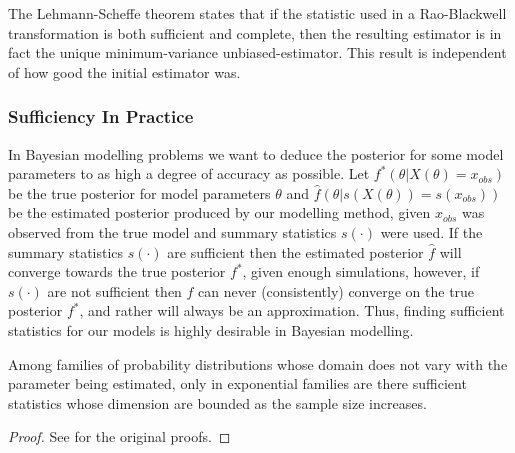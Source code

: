\documentclass[11pt,a4paper]{article}
\theoremstyle{break}
\begin{document}
  \par The Lehmann-Scheffe theorem \cite[]{lehmann_scheffe_theorem} states that if the statistic used in a Rao-Blackwell transformation is both sufficient and complete, then the resulting estimator is in fact the unique minimum-variance unbiased-estimator. This result is independent of how good the initial estimator was. %


  \subsubsection*{Sufficiency In Practice}

  \par In Bayesian modelling problems we want to deduce the posterior for some model parameters to as high a degree of accuracy as possible. Let $f^*(\theta|X(\theta)=x_{obs})$ be the true posterior for model parameters $\theta$ and $\hat{f}(\theta|s(X(\theta))=s(x_{obs}))$ be the estimated posterior produced by our modelling method, given $x_{obs}$ was observed from the true model and summary statistics $s(\cdot)$ were used. If the summary statistics $s(\cdot)$ are sufficient then the estimated posterior $\hat{f}$ will converge towards the true posterior $f^*$, given enough simulations, however, if $s(\cdot)$ are not sufficient then $\hat{f}$ can never (consistently) converge on the true posterior $f^*$, and rather will always be an approximation. Thus, finding sufficient statistics for our models is highly desirable in Bayesian modelling. %

  \begin{box_theorem}\label{the_pitman_koopman_darmois}
    Among families of probability distributions whose domain does not vary with the parameter being estimated, only in exponential families are there sufficient statistics whose dimension are bounded as the sample size increases.
    \begin{proof}
      See \cite[]{pkd_theorem_darmois_part,pkd_theorem_pitman_part,pkd_theorem_koopman_part} for the original proofs.
    \end{proof}
  \end{box_theorem}
\end{document}
